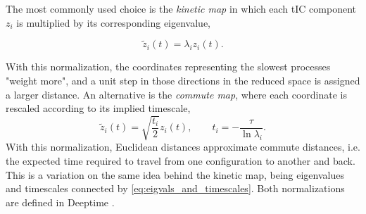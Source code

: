 The most commonly used choice is the \textit{kinetic map} in which each tIC component $z_i$ is multiplied by its corresponding eigenvalue,

\begin{equation}
\tilde z_i(t) = \lambda_i z_i(t).
\end{equation}

With this normalization, the coordinates representing the slowest processes "weight more", and a unit step in those directions in the reduced space is assigned a larger distance.
An alternative is the \textit{commute map}, where each coordinate is rescaled according to its implied timescale,
\begin{equation}
\tilde z_i(t) = \sqrt{\frac{t_i}{2}} z_i(t), \qquad t_i = -\frac{\tau}{\ln \lambda_i}.
\end{equation}
With this normalization, Euclidean distances approximate commute distances, i.e. the expected time required to travel from one configuration to another and back. This is a variation on the same idea behind the kinetic map, being eigenvalues and timescales connected by \eqref{eq:eigvals_and_timescales}. Both normalizations are defined in Deeptime \cite{deeptime}.
%
%
%
%
%
%
%
%
%
%
%
%
%
%
%
%

